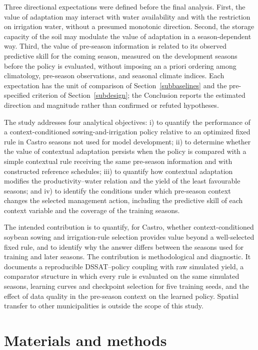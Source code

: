 \documentclass[times,final,authoryear]{elsarticle}
\begin{document}
Three directional expectations were defined before the final analysis. First, the value of adaptation may interact with water availability and with the restriction on irrigation water, without a presumed monotonic direction. Second, the storage capacity of the soil may modulate the value of adaptation in a season-dependent way. Third, the value of pre-season information is related to its observed predictive skill for the coming season, measured on the development seasons before the policy is evaluated, without imposing an a priori ordering among climatology, pre-season observations, and seasonal climate indices. Each expectation has the unit of comparison of Section~\ref{subbaselines} and the pre-specified criterion of Section~\ref{subdesign}; the Conclusion reports the estimated direction and magnitude rather than confirmed or refuted hypotheses.

The study addresses four analytical objectives: i) to quantify the performance of a context-conditioned sowing-and-irrigation policy relative to an optimized fixed rule in Castro seasons not used for model development; ii) to determine whether the value of contextual adaptation persists when the policy is compared with a simple contextual rule receiving the same pre-season information and with constructed reference schedules; iii) to quantify how contextual adaptation modifies the productivity--water relation and the yield of the least favourable seasons; and iv) to identify the conditions under which pre-season context changes the selected management action, including the predictive skill of each context variable and the coverage of the training seasons.

The intended contribution is to quantify, for Castro, whether context-conditioned soybean sowing and irrigation-rule selection provides value beyond a well-selected fixed rule, and to identify why the answer differs between the seasons used for training and later seasons. The contribution is methodological and diagnostic. It documents a reproducible DSSAT--policy coupling with raw simulated yield, a comparator structure in which every rule is evaluated on the same simulated seasons, learning curves and checkpoint selection for five training seeds, and the effect of data quality in the pre-season context on the learned policy. Spatial transfer to other municipalities is outside the scope of this study.

\section{Materials and methods}
\label{metodologia}
\end{document}
